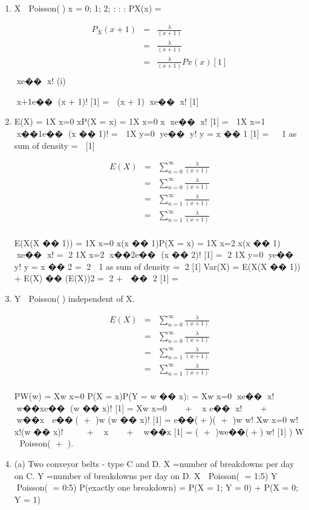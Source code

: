 \documentclass[a4paper,12pt]{article}
\begin{document}
\begin{enumerate}
    \item X  Poisson() x = 0; 1; 2; : : :
PX(x) =


\begin{eqnarray}
P_X(x + 1)  &=&   \frac{\lambda}{(x + 1)} \\
  &=&   \frac{\lambda}{(x + 1)} \\
   &=&   \frac{\lambda}{(x + 1)} Px(x) [1]\\
 
\end{eqnarray}
xe��
x!
(i)

x+1e��
(x + 1)!
[1]
=

(x + 1)
xe��
x!
[1]



\item 
E(X) =
1X
x=0
xP(X = x)
=
1X
x=0
x
xe��
x!
[1]
= 
1X
x=1
x��1e��
(x �� 1)!
= 
1X
y=0
ye��
y!
y = x �� 1 [1]
=   1 as sum of density
=  [1]

\begin{eqnarray*}
E(X)  &=&  \sum^{\infty}_{n=0}  \frac{\lambda}{(x + 1)}\\
&=&  \sum^{\infty}_{n=0}  \frac{\lambda}{(x + 1)}\\
&=&  \sum^{\infty}_{n=1}  \frac{\lambda}{(x + 1)}\\
&=&  \sum^{\infty}_{n=1}  \frac{\lambda}{(x + 1)}\\
\end{eqnarray*}


E(X(X �� 1)) =
1X
x=0
x(x �� 1)P(X = x)
=
1X
x=2
x(x �� 1)
xe��
x!
= 2
1X
x=2
x��2e��
(x �� 2)!
[1]
= 2
1X
y=0
ye��
y!
y = x �� 2
= 2  1 as sum of density
= 2 [1]
Var(X) = E(X(X �� 1)) + E(X) �� (E(X))2
= 2 +  �� 2 [1]
= 
\item  Y  Poisson() independent of X.

\begin{eqnarray*}
E(X)  &=&  \sum^{\infty}_{n=0}  \frac{\lambda}{(x + 1)}\\
&=&  \sum^{\infty}_{n=0}  \frac{\lambda}{(x + 1)}\\
&=&  \sum^{\infty}_{n=1}  \frac{\lambda}{(x + 1)}\\
&=&  \sum^{\infty}_{n=1}  \frac{\lambda}{(x + 1)}\\
\end{eqnarray*}


PW(w) =
Xw
x=0
P(X = x)P(Y = w �� x):
=
Xw
x=0
xe��
x!
w��xe��
(w �� x)!
[1]
=
Xw
x=0


 + 
x e��
x!


 + 
w��x

e��( + )w
(w �� x)!
[1]
=
e��(+)( + )w
w!
Xw
x=0
w!
x!(w �� x)!



 + 
x 

 + 
w��x
[1]
=
( + )we��(+)
w!
[1]
) W  Poisson( + ).
\item  (a) Two conveyor belts - type C and D.
X =number of breakdowns per day on C.
Y =number of breakdowns per day on D.
X  Poisson( = 1:5)
Y  Poisson( = 0:5)
P(exactly one breakdown) = P(X = 1; Y = 0) + P(X = 0; Y = 1)



\end{enumerate}
\end{document}
